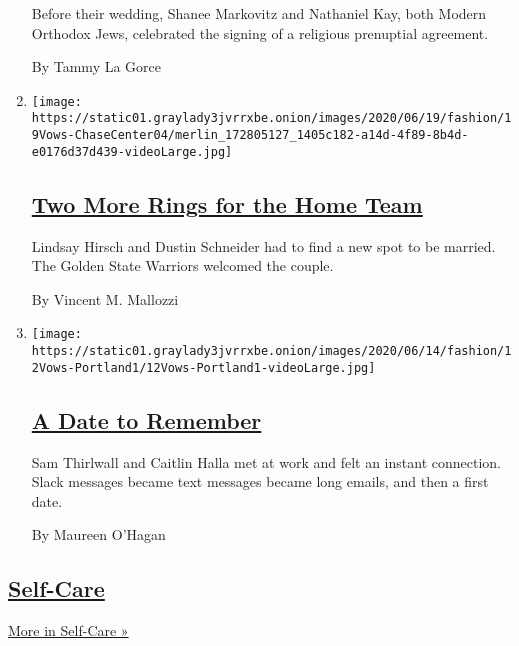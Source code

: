 \begin{enumerate}
  Before their wedding, Shanee Markovitz and Nathaniel Kay, both Modern
  Orthodox Jews, celebrated the signing of a religious prenuptial
  agreement.

  By Tammy La Gorce
\item
  \texttt{[image: https://static01.graylady3jvrrxbe.onion/images/2020/06/19/fashion/19Vows-ChaseCenter04/merlin\_172805127\_1405c182-a14d-4f89-8b4d-e0176d37d439-videoLarge.jpg]}

  \hypertarget{two-more-rings-for-the-home-team}{%
  \subsection{\texorpdfstring{\href{/2020/06/19/style/two-more-rings-for-the-home-team.html}{Two
  More Rings for the Home
  Team}}{Two More Rings for the Home Team}}\label{two-more-rings-for-the-home-team}}

  Lindsay Hirsch and Dustin Schneider had to find a new spot to be
  married. The Golden State Warriors welcomed the couple.

  By Vincent M. Mallozzi
\item
  \texttt{[image: https://static01.graylady3jvrrxbe.onion/images/2020/06/14/fashion/12Vows-Portland1/12Vows-Portland1-videoLarge.jpg]}

  \hypertarget{a-date-to-remember}{%
  \subsection{\texorpdfstring{\href{/2020/06/12/fashion/weddings/a-date-to-remember.html}{A
  Date to Remember}}{A Date to Remember}}\label{a-date-to-remember}}

  Sam Thirlwall and Caitlin Halla met at work and felt an instant
  connection. Slack messages became text messages became long emails,
  and then a first date.

  By Maureen O'Hagan
\end{enumerate}

\hypertarget{self-care}{%
\subsection{\texorpdfstring{\href{/section/style/self-care}{Self-Care}}{Self-Care}}\label{self-care}}

\href{/section/style/self-care}{More in Self-Care »}


